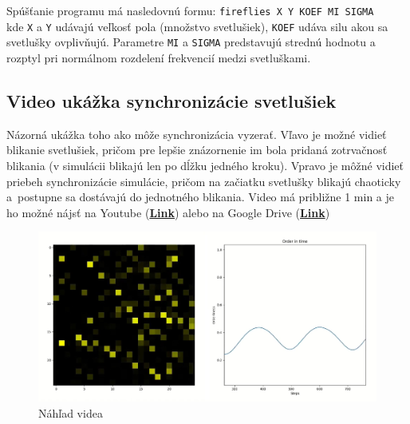 \documentclass[a4paper, 11pt]{article}
\begin{document}
Spúšťanie programu má nasledovnú formu: \texttt{fireflies X Y KOEF MI SIGMA}\\ 
kde \texttt{X} a \texttt{Y} udávajú veľkosť pola (množstvo svetlušiek), \texttt{KOEF} udáva silu akou sa svetlušky ovplivňujú. Parametre \texttt{MI} a \texttt{SIGMA} predstavujú strednú hodnotu a rozptyl pri normálnom rozdelení frekvencií medzi svetluškami.


\subsection{Video ukážka synchronizácie svetlušiek}
Názorná ukážka toho ako môže synchronizácia vyzerať. Vľavo je možné vidieť blikanie svetlušiek, pričom pre lepšie znázornenie im bola pridaná zotrvačnosť blikania (v simulácii blikajú len po dĺžku jedného kroku). Vpravo je môžné vidieť priebeh synchronizácie simulácie, pričom na začiatku svetlušky blikajú chaoticky a~postupne sa dostávajú do jednotného blikania. Video má približne 1 min a je ho možné nájsť na Youtube (\href{https://youtu.be/UF8tPC8jpdA}{\textbf{Link}}) alebo na Google Drive (\href{https://drive.google.com/file/d/1B7llCROASMtfPk-YtsiF4w4MxkObrWJH/view?usp=sharing}{\textbf{Link}})





\begin{figure}[h]
\centering
\includegraphics[width=15cm]{obr}
\caption{Náhľad videa\label{video}}
\end{figure}
\end{document}
